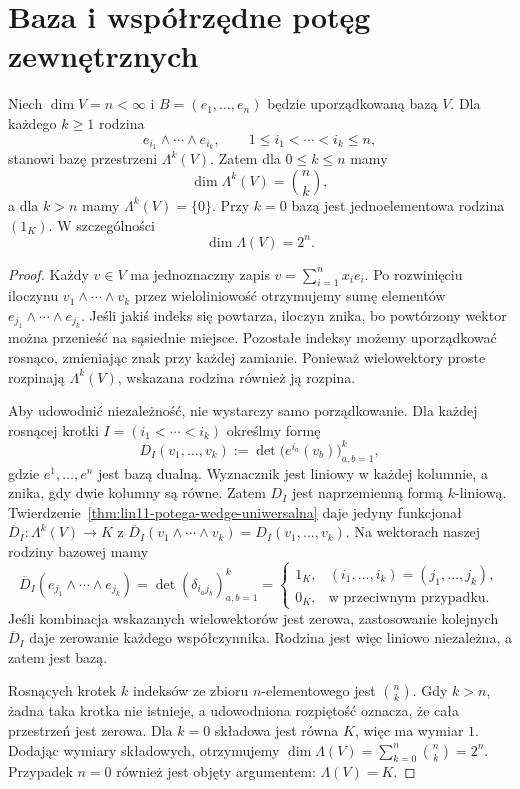 \section{Baza i współrzędne potęg zewnętrznych}
\label{sec:lin11-baza-wedge}

\begin{twierdzenie}
\label{thm:lin11-zew-baza}
Niech \(\dim V=n<\infty\)
i \(B=(e_1,\ldots,e_n)\)
będzie uporządkowaną bazą \(V\).
Dla każdego \(k\ge1\)
rodzina
\[
 e_{i_1}\wedge\cdots\wedge e_{i_k},
 \qquad
 1\leq i_1<\cdots<i_k\leq n,
\]
stanowi bazę przestrzeni \(\Lambda^k(V)\).
Zatem dla \(0\leq k\leq n\)
mamy
\[
 \dim\Lambda^k(V)=\binom nk,
\]
a dla \(k>n\) mamy
\(\Lambda^k(V)=\{0\}\).
Przy \(k=0\) bazą jest
jednoelementowa rodzina \((1_K)\).
W szczególności
\[
 \dim\Lambda(V)=2^n.
\]
\end{twierdzenie}
\begin{proof}
Każdy \(v\in V\) ma jednoznaczny
zapis \(v=\sum_{i=1}^n x_ie_i\).
Po rozwinięciu iloczynu
\(v_1\wedge\cdots\wedge v_k\)
przez wieloliniowość otrzymujemy
sumę elementów
\(e_{j_1}\wedge\cdots\wedge e_{j_k}\).
Jeśli jakiś indeks się powtarza,
iloczyn znika, bo powtórzony
wektor można przenieść na
sąsiednie miejsce.
Pozostałe indeksy możemy
uporządkować rosnąco, zmieniając
znak przy każdej zamianie.
Ponieważ wielowektory proste
rozpinają \(\Lambda^k(V)\),
wskazana rodzina również ją rozpina.

Aby udowodnić niezależność,
nie wystarczy samo porządkowanie.
Dla każdej rosnącej krotki
\(I=(i_1<\cdots<i_k)\)
określmy formę
\[
 D_I(v_1,\ldots,v_k)
 :=\det\bigl(e^{i_a}(v_b)\bigr)_{a,b=1}^k,
\]
gdzie \(e^1,\ldots,e^n\)
jest bazą dualną.
Wyznacznik jest liniowy
w każdej kolumnie, a znika,
gdy dwie kolumny są równe.
Zatem \(D_I\) jest naprzemienną
formą \(k\)-liniową.
Twierdzenie~\ref{thm:lin11-potega-wedge-uniwersalna}
daje jedyny funkcjonał
\(\overline D_I\colon\Lambda^k(V)\to K\)
z
\(\overline D_I(v_1\wedge\cdots\wedge v_k)
=D_I(v_1,\ldots,v_k)\).
Na wektorach naszej rodziny
bazowej mamy
\[
 \overline D_I(e_{j_1}\wedge\cdots\wedge e_{j_k})
 =\det(\delta_{i_a j_b})_{a,b=1}^k
 =\begin{cases}
   1_K,&(i_1,\ldots,i_k)=(j_1,\ldots,j_k),\\
   0_K,&\text{w przeciwnym przypadku}.
  \end{cases}
\]
Jeśli kombinacja wskazanych
wielowektorów jest zerowa,
zastosowanie kolejnych
\(\overline D_I\) daje
zerowanie każdego współczynnika.
Rodzina jest więc liniowo
niezależna, a zatem jest bazą.

Rosnących krotek \(k\) indeksów
ze zbioru \(n\)-elementowego
jest \(\binom nk\).
Gdy \(k>n\), żadna taka
krotka nie istnieje, a
udowodniona rozpiętość oznacza,
że cała przestrzeń jest zerowa.
Dla \(k=0\) składowa jest równa
\(K\), więc ma wymiar \(1\).
Dodając wymiary składowych,
otrzymujemy
\(\dim\Lambda(V)=\sum_{k=0}^n\binom nk
=2^n\). Przypadek \(n=0\)
również jest objęty argumentem:
\(\Lambda(V)=K\).
\end{proof}

